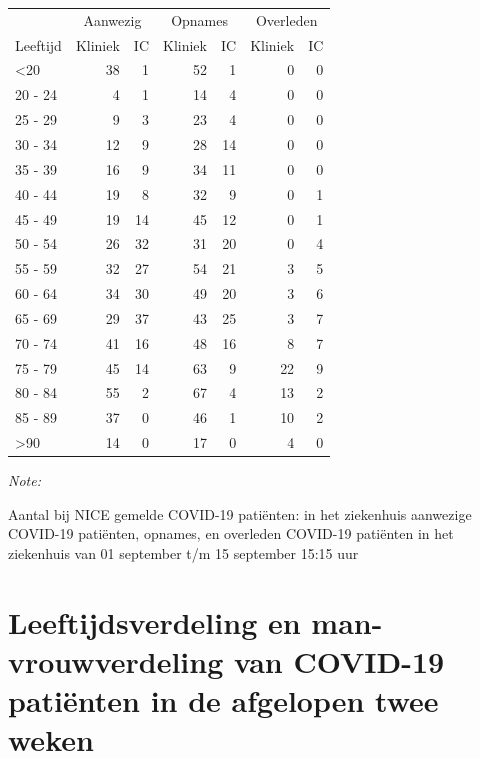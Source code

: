 \documentclass[
  english,
  man,floatsintext]{apa6}
\begin{document}
\begin{table}
\centering\begingroup\fontsize{10}{12}\selectfont

\begin{threeparttable}
\begin{tabular}{lrrrrrr}
\toprule
\multicolumn{1}{c}{ } & \multicolumn{2}{c}{Aanwezig} & \multicolumn{2}{c}{Opnames} & \multicolumn{2}{c}{Overleden} \\
\cmidrule(l{3pt}r{3pt}){2-3} \cmidrule(l{3pt}r{3pt}){4-5} \cmidrule(l{3pt}r{3pt}){6-7}
Leeftijd & Kliniek & IC & Kliniek & IC & Kliniek & IC\\
\midrule
<20 & 38 & 1 & 52 & 1 & 0 & 0\\
20 - 24 & 4 & 1 & 14 & 4 & 0 & 0\\
25 - 29 & 9 & 3 & 23 & 4 & 0 & 0\\
30 - 34 & 12 & 9 & 28 & 14 & 0 & 0\\
35 - 39 & 16 & 9 & 34 & 11 & 0 & 0\\
40 - 44 & 19 & 8 & 32 & 9 & 0 & 1\\
45 - 49 & 19 & 14 & 45 & 12 & 0 & 1\\
50 - 54 & 26 & 32 & 31 & 20 & 0 & 4\\
55 - 59 & 32 & 27 & 54 & 21 & 3 & 5\\
60 - 64 & 34 & 30 & 49 & 20 & 3 & 6\\
65 - 69 & 29 & 37 & 43 & 25 & 3 & 7\\
70 - 74 & 41 & 16 & 48 & 16 & 8 & 7\\
75 - 79 & 45 & 14 & 63 & 9 & 22 & 9\\
80 - 84 & 55 & 2 & 67 & 4 & 13 & 2\\
85 - 89 & 37 & 0 & 46 & 1 & 10 & 2\\
>90 & 14 & 0 & 17 & 0 & 4 & 0\\
\bottomrule
\end{tabular}
\begin{tablenotes}
\item \textit{Note: } 
\item Aantal bij NICE gemelde COVID-19 patiënten: in het ziekenhuis aanwezige COVID-19 patiënten, opnames, en overleden COVID-19 patiënten in het ziekenhuis van 01 september t/m 15 september 15:15 uur
\end{tablenotes}
\end{threeparttable}
\endgroup{}
\end{table}

\newpage

\hypertarget{leeftijdsverdeling-en-man-vrouwverdeling-van-covid-19-patiuxebnten-in-de-afgelopen-twee-weken}{%
\section{Leeftijdsverdeling en man-vrouwverdeling van COVID-19 patiënten in de afgelopen twee weken}\label{leeftijdsverdeling-en-man-vrouwverdeling-van-covid-19-patiuxebnten-in-de-afgelopen-twee-weken}}
\end{document}
